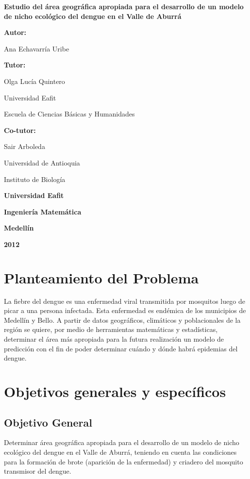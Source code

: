\documentclass[11pt, oneside]{article}
\theoremstyle{definition}
\theoremstyle{remark}
\newcommand\portada{
\begin{titlepage}
		\begin{center}
			{\large \bf Estudio del área geográfica apropiada para el desarrollo de un modelo de nicho ecológico del dengue en el Valle de Aburrá }
			\vfill
			{\large\bf Autor: \par}
			{\large Ana Echavarría Uribe\par}
			{\large\bf Tutor: \par}
			{\large Olga Lucía Quintero \par Universidad Eafit \par Escuela de Ciencias Básicas y Humanidades \par}
			{\large\bf Co-tutor: \par}
			{\large Sair Arboleda \par Universidad de Antioquia \par Instituto de Biología}
			\vfill
			{\large\bf Universidad Eafit  \par}
			{\large\bf Ingeniería Matemática \par}
			{\large\bf Medellín\par}
			{\large\bf 2012 \par}
		\end{center}
\end{titlepage}
}
\begin{document}
\portada


\renewcommand\contentsname{\centering Tabla de Contenidos}
\tableofcontents
\clearpage

\section{Planteamiento del Problema}

La fiebre del dengue es una enfermedad viral transmitida por mosquitos luego de picar a una persona infectada. Esta enfermedad es endémica de los municipios de Medellín y Bello. A partir de datos geográficos, climáticos y poblacionales de la región se quiere, por medio de herramientas matemáticas y estadísticas, determinar el área más apropiada para la futura realización un modelo de predicción con el fin de poder determinar cuándo y dónde habrá epidemias del dengue.

\section{Objetivos generales y específicos}

\subsection{Objetivo General}
Determinar área geográfica apropiada para el desarrollo de un modelo de nicho ecológico del dengue en el Valle de Aburrá, teniendo en cuenta las condiciones para la formación de brote (aparición de la enfermedad) y criadero del mosquito transmisor del dengue.\\
\end{document}
